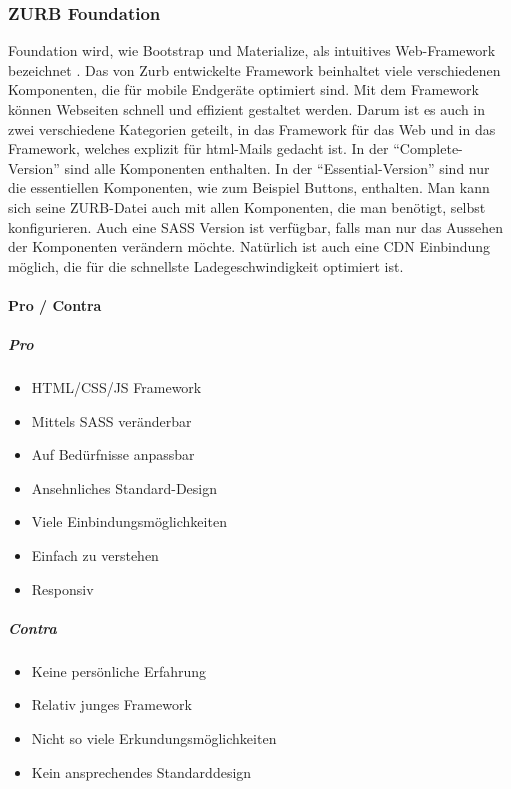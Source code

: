 		\subsubsection{ZURB Foundation}
		\label{chapter:study-frontend-frameworks-foundation}
		Foundation wird, wie Bootstrap und Materialize, als intuitives Web-Framework bezeichnet \cite{foundation-intro}. Das von Zurb entwickelte Framework beinhaltet viele verschiedenen Komponenten, die für mobile Endgeräte optimiert sind. Mit dem Framework können Webseiten schnell und effizient gestaltet werden. Darum ist es auch in zwei verschiedene Kategorien geteilt, in das Framework für das Web und in das Framework, welches explizit für html-Mails gedacht ist. In der \enquote{Complete-Version} sind alle Komponenten enthalten. In der \enquote{Essential-Version} sind nur die essentiellen Komponenten, wie zum Beispiel Buttons, enthalten. Man kann sich seine ZURB-Datei auch mit allen Komponenten, die man benötigt, selbst konfigurieren. Auch eine SASS Version ist verfügbar, falls man nur das Aussehen der Komponenten verändern möchte. Natürlich ist auch eine CDN Einbindung möglich, die für die schnellste Ladegeschwindigkeit optimiert ist.
		\paragraph{Pro / Contra}
		\subparagraph{Pro}
		\begin{itemize}
			\item HTML/CSS/JS Framework
			\item Mittels SASS veränderbar
			\item Auf Bedürfnisse anpassbar
			\item Ansehnliches Standard-Design 
			\item Viele Einbindungsmöglichkeiten
			\item Einfach zu verstehen
			\item Responsiv
		\end{itemize}
	\label{list:zurbpro}
		\subparagraph{Contra}
		\begin{itemize}
			\item Keine persönliche Erfahrung
			\item Relativ junges Framework
			\item Nicht so viele Erkundungsmöglichkeiten
			\item Kein ansprechendes Standarddesign
		\end{itemize}
	\label{list:zurbcontra}


